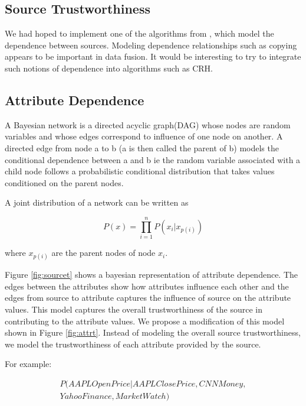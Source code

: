 \documentclass{acm_proc_article-sp}
\begin{document}
\subsection{Source Trustworthiness}

We had hoped to implement one of the algorithms from \cite{dong:integrating}, which model the dependence between sources. Modeling dependence relationships such as copying appears to be important in data fusion. It would be interesting to try to integrate such notions of dependence into algorithms such as {\sc CRH}. 

\subsection{Attribute Dependence}

A Bayesian network is a directed acyclic graph(DAG) whose nodes are random variables and whose edges correspond to influence of one node on another. A directed edge from node a to b (a is then called the parent of b) models the conditional dependence between a and b ie the random variable associated with a child node follows a probabilistic conditional distribution that takes values conditioned on the parent nodes.

A joint distribution of a network can be written as 

\begin{equation}
P(x) = \prod_{i=1}^n P(x_i|x_{p(i)})
\end{equation}

where $x_{p(i)}$ are the parent nodes of node $x_i$.

Figure \ref{fig:sourcet} shows a bayesian representation of attribute dependence. The edges between the attributes show how attributes influence each other and the edges from source to attribute captures the influence of source on the attribute values. This model captures the overall trustworthiness of the source in contributing to the attribute values.  We propose a modification of this model shown in Figure \ref{fig:attrt}. Instead of modeling the overall source trustworthiness, we model the trustworthiness of each attribute provided by the source. 

For example:


\begin{align}
P(AAPL Open Price|AAPL Close Price, CNN Money,\nonumber  
\\Yahoo Finance, Market Watch) 
\end{align}
\end{document}
